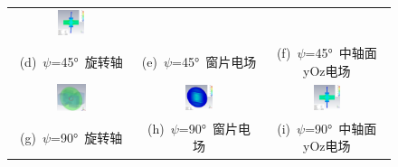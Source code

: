 \documentclass[master]{thesis-uestc}
\begin{document}
\begin{figure}[!htb]
\begin{tabular}{@{\ }c@{\ }c@{\ }c}
        \hspace{5pt}
        \includegraphics[width=0.23\textwidth]{pic/chapter5/X45电场切面.png}     \\
        \mbox{\small (d) \(\psi\)=45° 旋转轴}                                                                               & 
        \mbox{\small (e) \(\psi\)=45° 窗片电场}  & 
        \mbox{\small (f) \(\psi\)=45° 中轴面yOz电场}                                                                                  \\[6bp]
        \includegraphics[width=0.25\textwidth]{pic/chapter5/X90旋转轴.png} & 
        \hspace{5pt}
        \includegraphics[width=0.23\textwidth]{pic/chapter5/X90电场整体.png}& 
        \hspace{5pt}
        \includegraphics[width=0.23\textwidth]{pic/chapter5/X90电场切面.png}     \\
        \mbox{\small (g) \(\psi\)=90° 旋转轴}                                                                               & 
        \mbox{\small (h) \(\psi\)=90° 窗片电场}  & 
        \mbox{\small (i) \(\psi\)=90° 中轴面yOz电场}                                                                                  \\[6bp]

\end{tabular}
\end{figure}
\end{document}

